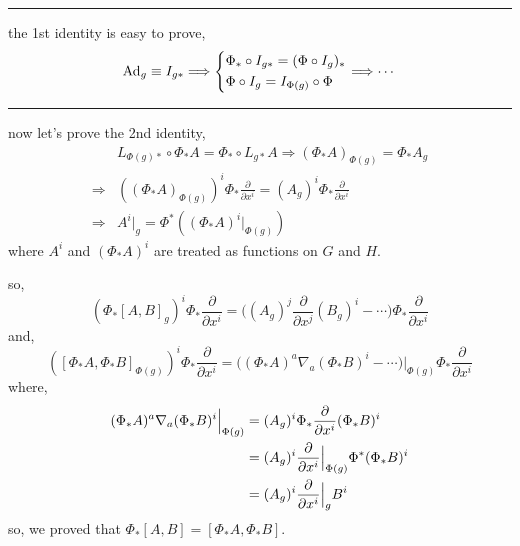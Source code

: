 \begin{itemize}
\begin{tcolorbox}[title=proof:]
		\noindent\rule[0.5ex]{\linewidth}{0.5pt} %
		
		the 1st identity is easy to prove,
		\begin{equation}
			\mathrm{Ad}_g \equiv I_{g *} \Longrightarrow \begin{dcases}
				\Phi_* \circ I_{g *} = (\Phi \circ I_g)_* \\
				\Phi \circ I_g = I_{\Phi(g)} \circ \Phi
			\end{dcases} \Longrightarrow \cdots
		\end{equation}
		
		\noindent\rule[0.5ex]{\linewidth}{0.5pt} %
		
		now let's prove the 2nd identity,
		\begin{align}
			& L_{\Phi(g) *} \circ \Phi_* A = \Phi_* \circ L_{g *} A \Longrightarrow (\Phi_* A)_{\Phi(g)} = \Phi_* A_g \\
			\Longrightarrow & ((\Phi_* A)_{\Phi(g)})^i \Phi_* \frac{\partial}{\partial x^i} = (A_g)^i \Phi_* \frac{\partial}{\partial x^i} \\
			\Longrightarrow & A^i \Big|_g = \Phi^*((\Phi_* A)^i \Big|_{\Phi(g)})
		\end{align}
		where $A^i$ and $(\Phi_* A)^i$ are treated as functions on $G$ and $H$.
		
		so, 
		\begin{equation}
			(\Phi_* [A, B]_g)^i \Phi_* \frac{\partial}{\partial x^i} = \Big( (A_g)^j \frac{\partial}{\partial x^j} (B_g)^i - \cdots \Big) \Phi_* \frac{\partial}{\partial x^i}
		\end{equation}
		and,
		\begin{equation}
			([\Phi_* A, \Phi_* B]_{\Phi(g)})^i \Phi_* \frac{\partial}{\partial x^i} = \Big( (\Phi_* A)^a \nabla_a (\Phi_* B)^i - \cdots \Big) \Big|_{\Phi(g)} \Phi_* \frac{\partial}{\partial x^i}
		\end{equation}
		where,
		\begin{align}
			(\Phi_* A)^a \nabla_a (\Phi_* B)^i \Big|_{\Phi(g)} &= (A_g)^i \Phi_* \frac{\partial}{\partial x^i} (\Phi_* B)^i \notag \\
			&= (A_g)^i \frac{\partial}{\partial x^i} \Big|_{\Phi(g)} \Phi^* (\Phi_* B)^i \notag \\
			&= (A_g)^i \frac{\partial}{\partial x^i} \Big|_g B^i
		\end{align}
		so, we proved that $\Phi_* [A, B] = [\Phi_* A, \Phi_* B]$.
	\end{tcolorbox}
	

\end{itemize}
